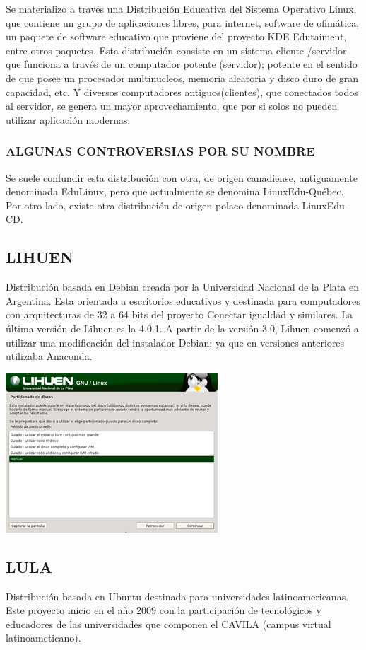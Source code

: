 Se materializo a través una Distribución Educativa del Sistema
Operativo Linux, que contiene un grupo de aplicaciones libres,
para internet, software de ofimática, un paquete de software
educativo que proviene del proyecto KDE Edutaiment, entre
otros paquetes. Esta distribución consiste en un sistema
cliente /servidor que funciona a través de un computador
potente (servidor); potente en el sentido de que posee un
procesador multinucleos, memoria aleatoria y disco duro de
gran capacidad, etc. Y diversos computadores antiguos(clientes),
que conectados todos al servidor, se genera un mayor
aprovechamiento, que por si solos no pueden utilizar aplicación
modernas.

\subsubsection*{ALGUNAS CONTROVERSIAS POR SU NOMBRE}

Se suele confundir esta distribución con otra, de origen
canadiense, antiguamente denominada EduLinux, pero que
actualmente se denomina LinuxEdu-Québec.
Por otro lado, existe otra distribución de origen polaco
denominada LinuxEdu-CD.

\subsection*{LIHUEN}
Distribución basada en Debian creada por la
Universidad Nacional de la Plata en Argentina.
Esta orientada a escritorios educativos y destinada para
computadores con arquitecturas de 32 a 64 bits del proyecto
Conectar igualdad y similares.
La última versión de Lihuen es la 4.0.1.
A partir de la versión 3.0, Lihuen comenzó a utilizar una
modificación del instalador Debian; ya que en versiones
anteriores utilizaba Anaconda.

\includegraphics[scale=0.5]{img/cp06/img0601.png}

\subsection*{LULA}
Distribución basada en Ubuntu destinada para
universidades latinoamericanas.
Este proyecto inicio en el año 2009 con la participación de
tecnológicos y educadores de las universidades que componen el
CAVILA (campus virtual latinoameticano).

